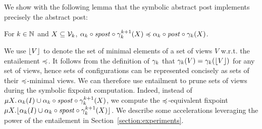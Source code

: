 We show with the following lemma that the symbolic abstract post
implements precisely the abstract post:
%
\begin{lemma}
\label{lemma:apost}
For $k\in\mathbb N$ and $X\subseteq\mathcal{V}_{k}$, $\alpha_{k} \circ \mathit{spost}
\circ \gamma_{k}^{k+1}(X)\preccurlyeq \alpha_{k}\circ \mathit{post} \circ
\gamma_{k}(X)$.
\end{lemma} 
%
We use $\lfloor V \rfloor$ to denote the set of minimal elements of a set of
views $V$ w.r.t. the entailement $\preccurlyeq$. %
It follows from the definition of $\gamma_{k}$ that $\gamma_{k}(V)
= \gamma_{k}(\lfloor V \rfloor)$ for any set of views, hence sets of
configurations can be represented concisely as sets of their
$\preccurlyeq$-minimal views. %
We can therefore use entailment to prune sets of views during the
symbolic fixpoint computation. %
Indeed, instead of $\mu X.\, \alpha_{k}(I)\cup \alpha_{k}\circ \mathit{spost}
\circ \gamma_{k}^{k+1}(X)$, we compute the
$\preccurlyeq$-equivalent fixpoint $\mu X. \lfloor \alpha_{k}(I)\cup
  \alpha_{k}\circ \mathit{spost} \circ \gamma_{k}^{k+1}(X) \rfloor$.
% 
We describe some accelerations leveraging the power of the entailement
in Section~\ref{section:experiments}.
%
